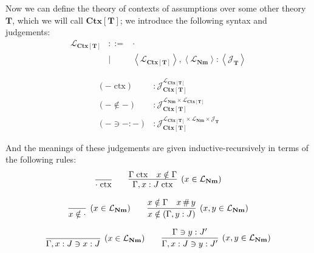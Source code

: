 \documentclass{amsart}
\theoremstyle{definition}
\theoremstyle{remark}
\numberwithin{equation}{section}
\newcommand{\quo}[1]{\left\langle#1\right\rangle}
\begin{document}
Now we can define the theory of contexts of assumptions over some other theory
$\mathbf{T}$, which we will call $\mathbf{Ctx}[\mathbf{T}]$; we introduce the
following syntax and judgements:
\[
  \begin{array}{lcl}
    \mathcal{L}_{\mathbf{Ctx}[\mathbf{T}]}
      &::= &\cdot\\
      &\mid & \quo{\mathcal{L}_{\mathbf{Ctx}[\mathbf{T}]}},\quo{\mathcal{L}_\mathbf{Nm}}:\quo{\mathcal{J}_\mathbf{T}}
  \end{array}
\]

\begin{align*}
  (-\;\mathrm{ctx}) &: \mathcal{J}_{\mathbf{Ctx}[\mathbf{T}]}^{\mathcal{L}_{\mathbf{Ctx}[\mathbf{T}]}}\\
  (-\notin-) &: \mathcal{J}_{\mathbf{Ctx}[\mathbf{T}]}^{\mathcal{L}_\mathbf{Nm}\times\mathcal{L}_{\mathbf{Ctx}[\mathbf{T}]}}\\
  (-\ni-:-) &: \mathcal{J}_{\mathbf{Ctx}[\mathbf{T}]}^{\mathcal{L}_{\mathbf{Ctx}[\mathbf{T}]}\times\mathcal{L}_\mathbf{Nm}\times\mathcal{J}_\mathbf{T}}
\end{align*}

And the meanings of these judgements are given inductive-recursively in terms of the
following rules:
\begin{gather*}
  \infer{\cdot\;\mathrm{ctx}}{}
  \qquad
  \infer[(x\in \mathcal{L}_\mathbf{Nm})]{
    \Gamma,x:J\;\mathrm{ctx}
  }{
    \Gamma\;\mathrm{ctx}
    & x\notin\Gamma
  }\\[6pt]
  \infer[(x\in \mathcal{L}_\mathbf{Nm})]{
    x\notin\cdot
  }{}
  \qquad
  \infer[(x,y \in \mathcal{L}_\mathbf{Nm})]{
    x\notin(\Gamma,y:J)
  }{
    x\notin\Gamma
    & x\mathop{\#}y
  }\\[6pt]
  \infer[(x\in \mathcal{L}_\mathbf{Nm})]{\Gamma,x:J\ni x:J}{}
  \qquad
  \infer[(x,y\in \mathcal{L}_\mathbf{Nm})]{
    \Gamma,x:J\ni y:J'
  }{
    \Gamma\ni y:J'
  }
\end{gather*}
\end{document}
